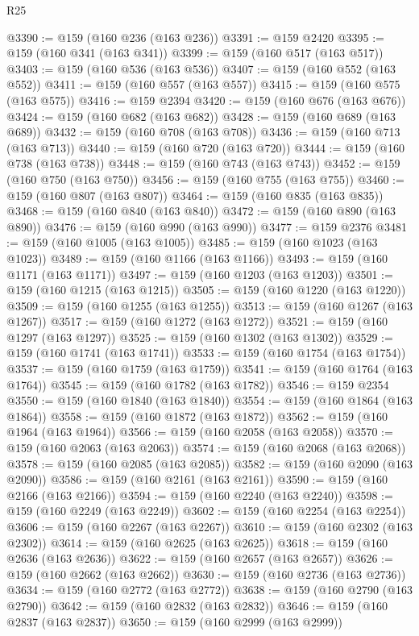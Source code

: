 \begin{lexlean}{R25}
\begin{coremodule}
@3390 := @159 (@160 @236 (@163 @236))
@3391 := @159 @2420
@3395 := @159 (@160 @341 (@163 @341))
@3399 := @159 (@160 @517 (@163 @517))
@3403 := @159 (@160 @536 (@163 @536))
@3407 := @159 (@160 @552 (@163 @552))
@3411 := @159 (@160 @557 (@163 @557))
@3415 := @159 (@160 @575 (@163 @575))
@3416 := @159 @2394
@3420 := @159 (@160 @676 (@163 @676))
@3424 := @159 (@160 @682 (@163 @682))
@3428 := @159 (@160 @689 (@163 @689))
@3432 := @159 (@160 @708 (@163 @708))
@3436 := @159 (@160 @713 (@163 @713))
@3440 := @159 (@160 @720 (@163 @720))
@3444 := @159 (@160 @738 (@163 @738))
@3448 := @159 (@160 @743 (@163 @743))
@3452 := @159 (@160 @750 (@163 @750))
@3456 := @159 (@160 @755 (@163 @755))
@3460 := @159 (@160 @807 (@163 @807))
@3464 := @159 (@160 @835 (@163 @835))
@3468 := @159 (@160 @840 (@163 @840))
@3472 := @159 (@160 @890 (@163 @890))
@3476 := @159 (@160 @990 (@163 @990))
@3477 := @159 @2376
@3481 := @159 (@160 @1005 (@163 @1005))
@3485 := @159 (@160 @1023 (@163 @1023))
@3489 := @159 (@160 @1166 (@163 @1166))
@3493 := @159 (@160 @1171 (@163 @1171))
@3497 := @159 (@160 @1203 (@163 @1203))
@3501 := @159 (@160 @1215 (@163 @1215))
@3505 := @159 (@160 @1220 (@163 @1220))
@3509 := @159 (@160 @1255 (@163 @1255))
@3513 := @159 (@160 @1267 (@163 @1267))
@3517 := @159 (@160 @1272 (@163 @1272))
@3521 := @159 (@160 @1297 (@163 @1297))
@3525 := @159 (@160 @1302 (@163 @1302))
@3529 := @159 (@160 @1741 (@163 @1741))
@3533 := @159 (@160 @1754 (@163 @1754))
@3537 := @159 (@160 @1759 (@163 @1759))
@3541 := @159 (@160 @1764 (@163 @1764))
@3545 := @159 (@160 @1782 (@163 @1782))
@3546 := @159 @2354
@3550 := @159 (@160 @1840 (@163 @1840))
@3554 := @159 (@160 @1864 (@163 @1864))
@3558 := @159 (@160 @1872 (@163 @1872))
@3562 := @159 (@160 @1964 (@163 @1964))
@3566 := @159 (@160 @2058 (@163 @2058))
@3570 := @159 (@160 @2063 (@163 @2063))
@3574 := @159 (@160 @2068 (@163 @2068))
@3578 := @159 (@160 @2085 (@163 @2085))
@3582 := @159 (@160 @2090 (@163 @2090))
@3586 := @159 (@160 @2161 (@163 @2161))
@3590 := @159 (@160 @2166 (@163 @2166))
@3594 := @159 (@160 @2240 (@163 @2240))
@3598 := @159 (@160 @2249 (@163 @2249))
@3602 := @159 (@160 @2254 (@163 @2254))
@3606 := @159 (@160 @2267 (@163 @2267))
@3610 := @159 (@160 @2302 (@163 @2302))
@3614 := @159 (@160 @2625 (@163 @2625))
@3618 := @159 (@160 @2636 (@163 @2636))
@3622 := @159 (@160 @2657 (@163 @2657))
@3626 := @159 (@160 @2662 (@163 @2662))
@3630 := @159 (@160 @2736 (@163 @2736))
@3634 := @159 (@160 @2772 (@163 @2772))
@3638 := @159 (@160 @2790 (@163 @2790))
@3642 := @159 (@160 @2832 (@163 @2832))
@3646 := @159 (@160 @2837 (@163 @2837))
@3650 := @159 (@160 @2999 (@163 @2999))

\end{coremodule}
\end{lexlean}
